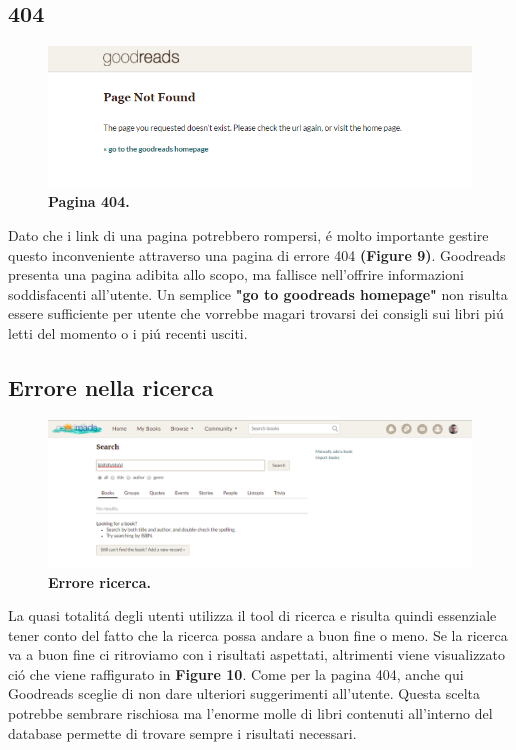 \documentclass[12pt]{article}
\begin{document}
\subsection{404}
\begin{figure}
	\centering 
	\includegraphics[width=16.5cm]{resources/404.png}
	\caption{\textbf{Pagina 404.}}
\end{figure}

Dato che i link di una pagina potrebbero rompersi, \'e molto importante gestire questo inconveniente attraverso una pagina di errore 404 \textbf{(Figure 9)}. Goodreads presenta una pagina adibita allo scopo, ma fallisce nell'offrire informazioni soddisfacenti all'utente. Un semplice \textbf{"go to goodreads homepage"} non risulta essere sufficiente per utente che vorrebbe magari trovarsi dei consigli sui libri pi\'u letti del momento o i pi\'u recenti usciti.

\subsection{Errore nella ricerca}
\begin{figure}
	\centering 
	\includegraphics[width=16.5cm]{resources/errore_ricerca.png}
	\caption{\textbf{Errore ricerca.}}
\end{figure}

La quasi totalit\'a degli utenti utilizza il tool di ricerca e risulta quindi essenziale tener conto del fatto che la ricerca possa andare a buon fine o meno. Se la ricerca va a buon fine ci ritroviamo con i risultati aspettati, altrimenti viene visualizzato ci\'o che viene raffigurato in \textbf{Figure 10}. Come per la pagina 404, anche qui Goodreads sceglie di non dare ulteriori suggerimenti all'utente. Questa scelta potrebbe sembrare rischiosa ma l'enorme molle di libri contenuti all'interno del database permette di trovare sempre i risultati necessari.
\end{document}
